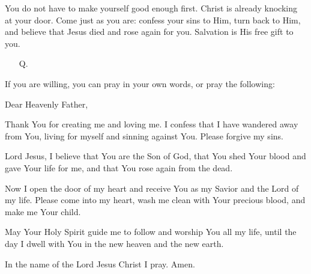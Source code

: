 \begin{center}
\begin{tcolorbox}
\hspace{0.5cm} You do not have to make yourself good enough first. Christ is already knocking at your door. Come just as you are: confess your sins to Him, turn back to Him, and believe that Jesus died and rose again for you. Salvation is His free gift to you.

\vspace{0.15cm}

\begin{itemize}[leftmargin=2em, labelsep=0.3em]
\item[Q.] 
\end{itemize}


If you are willing, you can pray in your own words, or pray the following:

\begin{tcolorbox}[
    width=\linewidth,
    colback=PrayerGold,
    colframe=GospelMaroon!80,
    colbacktitle=GospelMaroon!80,
    coltitle=white,
    title={Prayer},
    center title,
    boxrule=0.5pt,
    arc=1.5mm,
    breakable,
    left=1pt,
    right=1pt,
    top=1pt,
    bottom=1pt
]
Dear Heavenly Father,

\hspace{0.5cm} Thank You for creating me and loving me. I confess that I have wandered away from You, living for myself and sinning against You. Please forgive my sins.

\hspace{0.5cm} Lord Jesus, I believe that You are the Son of God, that You shed Your blood and gave Your life for me, and that You rose again from the dead.

\hspace{0.5cm} Now I open the door of my heart and receive You as my Savior and the Lord of my life. Please come into my heart, wash me clean with Your precious blood, and make me Your child.

\hspace{0.5cm} May Your Holy Spirit guide me to follow and worship You all my life, until the day I dwell with You in the new heaven and the new earth.

\hspace{0.5cm} In the name of the Lord Jesus Christ I pray. Amen.
\end{tcolorbox}


\end{tcolorbox}
\end{center}
